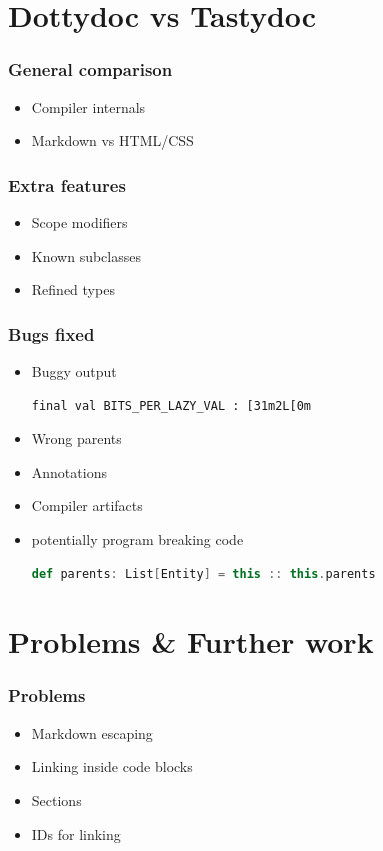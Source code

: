 \documentclass{beamer}
\begin{document}
\section{Dottydoc vs Tastydoc}

\begin{frame}
  \frametitle{General comparison}
  \pause
  \begin{itemize}
    \item Compiler internals \pause
    \item Markdown vs HTML/CSS
  \end{itemize}
\end{frame}

\begin{frame}
  \frametitle{Extra features}
  \pause
  \begin{itemize}
    \item Scope modifiers \pause
    \item Known subclasses \pause
    \item Refined types
  \end{itemize}
\end{frame}

\begin{frame}[fragile]
  \frametitle{Bugs fixed}
  \pause
  \begin{itemize}
    \item Buggy output
\begin{lstlisting}
final val BITS_PER_LAZY_VAL : [31m2L[0m
\end{lstlisting}\pause
    \item Wrong parents \pause
    \item Annotations \pause
    \item Compiler artifacts \pause
    \item potentially program breaking code
\begin{lstlisting}[language=scala]
def parents: List[Entity] = this :: this.parents
\end{lstlisting}
  \end{itemize}
\end{frame}

\section{Problems \& Further work}

\begin{frame}
  \frametitle{Problems}
  \pause
  \begin{itemize}
    \item Markdown escaping \pause
    \item Linking inside code blocks \pause
    \item Sections \pause
    \item IDs for linking
  \end{itemize}
\end{frame}
\end{document}
